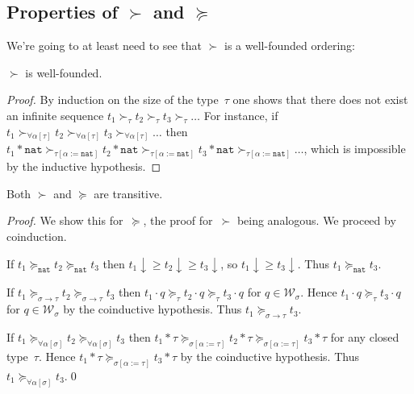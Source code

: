 \documentclass[runningheads,a4paper]{llncs}
\newcommand{\World}{\mathcal{W}}
\newcommand{\app}[2]{#1 \cdot #2}
\newcommand{\tapp}[2]{#1 * #2}
\newcommand{\subst}[2]{#1:=#2}
\newcommand{\nat}{\mathtt{nat}}
\newcommand{\da}{\downarrow}
\begin{document}
\subsection{Properties of $\succ$ and $\succeq$}

We're going to at least need to see that $\succ$ is a well-founded ordering:

\begin{lemma}
$\succ$ is well-founded.
\end{lemma}

\begin{proof}
  By induction on the size of the type~$\tau$ one shows that there does
  not exist an infinite sequence
  $t_1 \succ_\tau t_2 \succ_\tau t_3 \succ_\tau \ldots$ For instance,
  if
  $t_1 \succ_{\forall\alpha[\tau]} t_2 \succ_{\forall\alpha[\tau]} t_3
  \succ_{\forall\alpha[\tau]} \ldots$ then
  $\tapp{t_1}{\nat} \succ_{\tau[\subst{\alpha}{\nat}]}
  \tapp{t_2}{\nat} \succ_{\tau[\subst{\alpha}{\nat}]} \tapp{t_3}{\nat}
  \succ_{\tau[\subst{\alpha}{\nat}]} \ldots$, which is impossible by
  the inductive hypothesis.
\end{proof}

\begin{lemma}
Both $\succ$ and $\succeq$ are transitive.
\end{lemma}

\begin{proof}
  We show this for~$\succeq$, the proof for~$\succ$ being
  analogous. We proceed by coinduction.

  If $t_1 \succeq_\nat t_2 \succeq_\nat t_3$ then
  $t_1\da \ge t_2\da \ge t_3\da$, so $t_1\da \ge t_3\da$. Thus
  $t_1 \succeq_\nat t_3$.

  If $t_1 \succeq_{\sigma\to\tau}t_2\succeq_{\sigma\to\tau}t_3$ then
  $\app{t_1}{q}\succeq_{\tau}\app{t_2}{q}\succeq_\tau\app{t_3}{q}$ for
  $q \in \World_\sigma$. Hence $\app{t_1}{q}\succeq_\tau\app{t_3}{q}$
  for $q \in \World_\sigma$ by the coinductive hypothesis. Thus
  $t_1\succeq_{\sigma\to\tau} t_3$.

  If $t_1 \succeq_{\forall\alpha[\sigma]}t_2\succeq_{\forall\alpha[\sigma]}t_3$ then
  $\tapp{t_1}{\tau}\succeq_{\sigma[\subst{\alpha}{\tau}]}\tapp{t_2}{\tau}\succeq_{\sigma[\subst{\alpha}{\tau}]}\tapp{t_3}{\tau}$ for
  any closed type~$\tau$. Hence
  $\tapp{t_1}{\tau}\succeq_{\sigma[\subst{\alpha}{\tau}]}\tapp{t_3}{\tau}$
  by the coinductive hypothesis. Thus $t_1\succeq_{\forall\alpha[\sigma]} t_3$.\qed
\end{proof}
\end{document}
